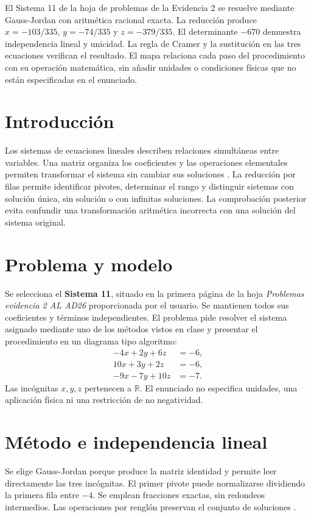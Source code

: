 \documentclass[spanish,letterpaper,oneside]{article}
\begin{document}
\templatePortrait
\templatePagecfg
\onehalfspacing
\begin{abstractd}
El Sistema 11 de la hoja de problemas de la Evidencia 2 se resuelve mediante
Gauss-Jordan con aritmética racional exacta. La reducción produce
$x=-103/335$, $y=-74/335$ y $z=-379/335$. El determinante $-670$ demuestra
independencia lineal y unicidad. La regla de Cramer y la sustitución en las
tres ecuaciones verifican el resultado. El mapa relaciona cada paso del
procedimiento con su operación matemática, sin añadir unidades o condiciones
físicas que no están especificadas en el enunciado.
\end{abstractd}
\templateIndex
\templateFinalcfg
\section{Introducción}
Los sistemas de ecuaciones lineales describen relaciones simultáneas entre
variables. Una matriz organiza los coeficientes y las operaciones elementales
permiten transformar el sistema sin cambiar sus soluciones
\citep{strang2016}. La reducción por filas permite identificar pivotes,
determinar el rango y distinguir sistemas con solución única, sin solución
o con infinitas soluciones. La comprobación posterior evita confundir una
transformación aritmética incorrecta con una solución del sistema original.

\section{Problema y modelo}
Se selecciona el \textbf{Sistema 11}, situado en la primera página de la
hoja \textit{Problemas evidencia 2 AL AD26} proporcionada por el usuario.
Se mantienen todos sus coeficientes y términos independientes. El problema
pide resolver el sistema asignado mediante uno de los métodos vistos en
clase y presentar el procedimiento en un diagrama tipo algoritmo:
\begin{equation}
\begin{aligned}
-4x+2y+6z&=-6,\\
10x+3y+2z&=-6,\\
-9x-7y+10z&=-7.
\end{aligned}
\end{equation}
Las incógnitas $x,y,z$ pertenecen a $\mathbb R$. El enunciado no especifica
unidades, una aplicación física ni una restricción de no negatividad.

\section{Método e independencia lineal}
Se elige Gauss-Jordan porque produce la matriz identidad y permite leer
directamente las tres incógnitas. El primer pivote puede normalizarse
dividiendo la primera fila entre $-4$. Se emplean
fracciones exactas, sin redondeos intermedios. Las operaciones por renglón
preservan el conjunto de soluciones \citep{strang2016}.
\end{document}
